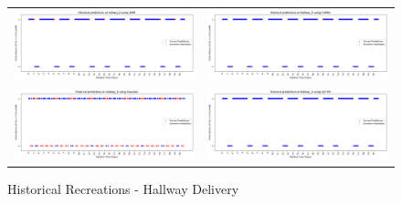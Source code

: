 \begin{figure}
  \begin{tabular}{cc}
    {\includegraphics[width = 3in]{images/results/Historical_hallway_D_DMM.png}} &
    {\includegraphics[width = 3in]{images/results/Historical_hallway_D_FreMEn.png}} \\
    {\includegraphics[width = 3in]{images/results/Historical_hallway_D_Gaussian.png}} &
    {\includegraphics[width = 3in]{images/results/Historical_hallway_D_HyT-EM.png}} \\
  \end{tabular}
  \caption{Historical Recreations - Hallway Delivery}
\end{figure}\\ \\

